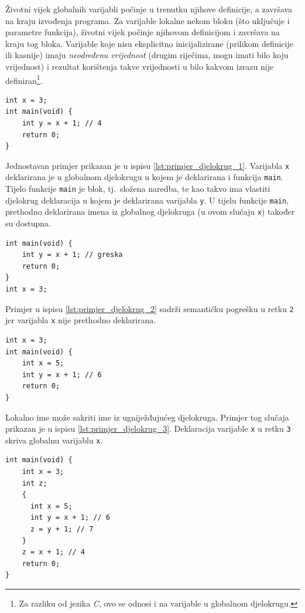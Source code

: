 \documentclass[times, 12pt, utf8]{book}
\begin{document}
Životni vijek globalnih varijabli počinje u trenutku njihove definicije, a završava na kraju izvođenja programa.
Za varijable lokalne nekom bloku (što uključuje i parametre funkcija), životni vijek počinje njihovom definicijom i završava na kraju tog bloka.
Varijable koje nisu eksplicitno inicijalizirane (prilikom definicije ili kasnije) imaju \emph{neodređenu vrijednost} (drugim riječima, mogu imati bilo koju vrijednost) i rezultat korištenja takve vrijednosti u bilo kakvom izrazu nije definiran\footnote{Za razliku od jezika \emph{C}, ovo se odnosi i na varijable u globalnom djelokrugu.}.

\begin{lstlisting}[caption={Jednostavan primjer djelokruga deklaracija.},label=lst:primjer_djelokrug_1]
int x = 3;
int main(void) {
    int y = x + 1; // 4
    return 0;
}
\end{lstlisting}

Jednostavan primjer prikazan je u ispisu \ref{lst:primjer_djelokrug_1}.
Varijabla \verb|x| deklarirana je u globalnom djelokrugu u kojem je deklarirana i funkcija \verb|main|.
Tijelo funkcije \verb|main| je blok, tj.~složena naredba, te kao takvo ima vlastiti djelokrug deklaracija u kojem je deklarirana varijabla \verb|y|.
U tijelu funkcije \verb|main|, prethodno deklarirana imena iz globalnog djelokruga (u ovom slučaju \verb|x|) također su dostupna.

\begin{lstlisting}[caption={Primjer pogreške u djelokrugu---varijabla \texttt{x} nije deklarirana prije korištenja.},label=lst:primjer_djelokrug_2]
int main(void) {
    int y = x + 1; // greska
    return 0;
}
int x = 3;
\end{lstlisting}

Primjer u ispisu \ref{lst:primjer_djelokrug_2} sadrži semantičku pogrešku u retku \verb|2| jer varijabla \verb|x| nije prethodno deklarirana.

\begin{lstlisting}[caption={Sakrivanje globalne deklaracije.},label=lst:primjer_djelokrug_3]
int x = 3;
int main(void) {
    int x = 5;
    int y = x + 1; // 6
    return 0;
}
\end{lstlisting}

Lokalno ime može sakriti ime iz ugniježđujućeg djelokruga.
Primjer tog slučaja prikazan je u ispisu \ref{lst:primjer_djelokrug_3}.
Deklaracija varijable \verb|x| u retku \verb|3| skriva globalnu varijablu \verb|x|.

\begin{lstlisting}[caption={Sakrivanje deklaracije u bloku.},label=lst:primjer_djelokrug_4]
int main(void) {
    int x = 3;
    int z;
    {
      int x = 5;
      int y = x + 1; // 6
      z = y + 1; // 7
    }
    z = x + 1; // 4
    return 0;
}
\end{lstlisting}
\end{document}

